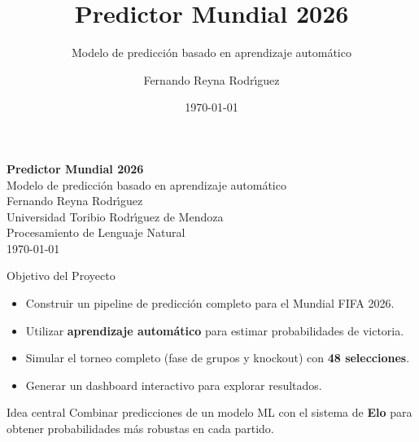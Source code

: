 \documentclass[aspectratio=169,11pt]{beamer}
\title{Predictor Mundial 2026}
\subtitle{Modelo de predicci\'on basado en aprendizaje autom\'atico}
\author{Fernando Reyna Rodr\'{\i}guez}
\institute{Universidad Toribio Rodr\'{\i}guez de Mendoza\\Procesamiento de Lenguaje Natural}
\date{\today}
\begin{document}
\begin{frame}[plain]

\vspace*{1.5cm}
\begin{center}
  {\Huge\bfseries Predictor Mundial 2026}\\[12pt]
  {\Large\color{acento} Modelo de predicci\'on basado en aprendizaje autom\'atico}\\[30pt]
  {\large\color{blanco} Fernando Reyna Rodr\'{\i}guez}\\[8pt]
  {\color{acento} Universidad Toribio Rodr\'{\i}guez de Mendoza}\\[4pt]
  {\color{acento!70!white} Procesamiento de Lenguaje Natural}\\[20pt]
  {\small\color{acento!60!white} \today}
\end{center}
\end{frame}

\begin{frame}{Objetivo del Proyecto}
\begin{itemize}
  \item Construir un pipeline de predicci\'on completo para el Mundial FIFA 2026.
  \item Utilizar \textbf{aprendizaje autom\'atico} para estimar probabilidades de victoria.
  \item Simular el torneo completo (fase de grupos y knockout) con \textbf{48 selecciones}.
  \item Generar un dashboard interactivo para explorar resultados.
\end{itemize}

\vspace{12pt}
\begin{block}{Idea central}
Combinar predicciones de un modelo ML con el sistema de \textbf{Elo} para obtener probabilidades m\'as robustas en cada partido.
\end{block}
\end{frame}
\end{document}

